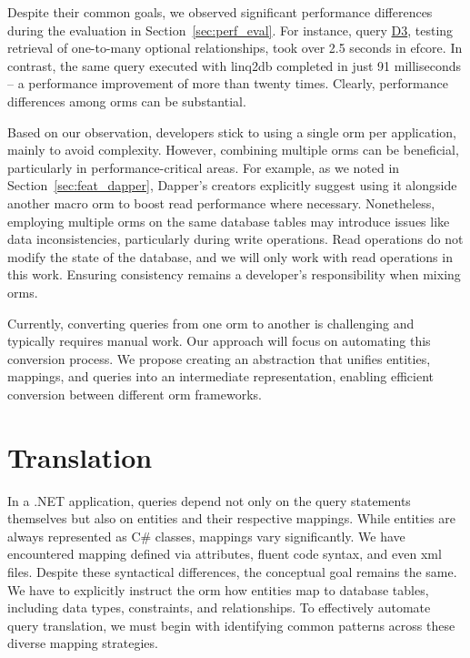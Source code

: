 Despite their common goals, we observed significant performance differences during the evaluation in Section~\ref{sec:perf_eval}. For instance, query \hyperref[query:d3]{D3}, testing retrieval of one-to-many optional relationships, took over 2.5 seconds in \acrshort{efcore}. In contrast, the same query executed with linq2db completed in just 91 milliseconds -- a performance improvement of more than twenty times. Clearly, performance differences among \acrshort{orm}s can be substantial.

Based on our observation, developers stick to using a single \acrshort{orm} per application, mainly to avoid complexity. However, combining multiple \acrshort{orm}s can be beneficial, particularly in performance-critical areas. For example, as we noted in Section~\ref{sec:feat_dapper}, Dapper's creators explicitly suggest using it alongside another macro \acrshort{orm} to boost read performance where necessary. Nonetheless, employing multiple \acrshort{orm}s on the same database tables may introduce issues like data inconsistencies, particularly during write operations. Read operations do not modify the state of the database, and we will only work with read operations in this work. Ensuring consistency remains a developer's responsibility when mixing \acrshort{orm}s.

Currently, converting queries from one \acrshort{orm} to another is challenging and typically requires manual work. Our approach will focus on automating this conversion process. We propose creating an abstraction that unifies entities, mappings, and queries into an intermediate representation, enabling efficient conversion between different \acrshort{orm} frameworks.

\section{Translation}\label{sec:core_translation}

In a .NET application, queries depend not only on the query statements themselves but also on entities and their respective mappings. While entities are always represented as C\# classes, mappings vary significantly. We have encountered mapping defined via attributes, fluent code syntax, and even \acrshort{xml} files. Despite these syntactical differences, the conceptual goal remains the same. We have to explicitly instruct the \acrshort{orm} how entities map to database tables, including data types, constraints, and relationships. To effectively automate query translation, we must begin with identifying common patterns across these diverse mapping strategies.

